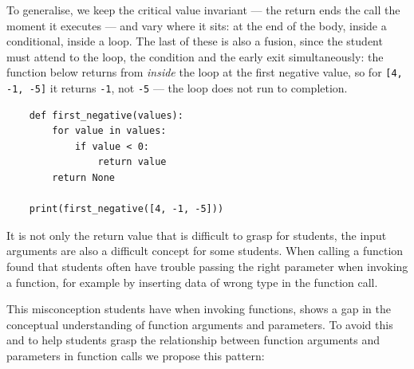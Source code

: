 To generalise, we keep the critical value invariant --- the return ends the
call the moment it executes --- and vary where it sits: at the end of the
body, inside a conditional, inside a loop.
The last of these is also a fusion, since the student must attend to the
loop, the condition and the early exit simultaneously: the function below
returns from \emph{inside} the loop at the first negative value, so for
\texttt{[4, -1, -5]} it returns \texttt{-1}, not
\texttt{-5} --- the loop does not run to completion.

\hfill
\begin{verbatim}
    def first_negative(values):
        for value in values:
            if value < 0:
                return value
        return None

    print(first_negative([4, -1, -5]))
\end{verbatim}
\hfill

It is not only the return value that is difficult to grasp for students,
the 
input arguments are also a difficult concept for some students. When 
calling a 
function \textcite{AltadmriBrown2015} found that students often have 
trouble passing the right parameter when invoking a function, for example 
by inserting data of wrong type in the function call. 

This misconception students have when invoking functions, shows a gap in 
the conceptual understanding of function arguments and parameters. To 
avoid this and to help students grasp the relationship between function 
arguments and parameters in function calls we propose this pattern:

